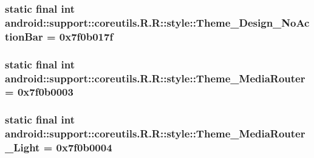\hypertarget{classandroid_1_1support_1_1coreutils_1_1_r_1_1style_0ce6d91f4469052e3060214f19d3eef9}{
\subsubsection[{Theme\_\-Design\_\-NoActionBar}]{\setlength{\rightskip}{0pt plus 5cm}static final int android::support::coreutils.R.R::style::Theme\_\-Design\_\-NoActionBar = 0x7f0b017f}}
\label{classandroid_1_1support_1_1coreutils_1_1_r_1_1style_0ce6d91f4469052e3060214f19d3eef9}


\hypertarget{classandroid_1_1support_1_1coreutils_1_1_r_1_1style_2dc043315162adcd87e26e2744a64a3c}{
\subsubsection[{Theme\_\-MediaRouter}]{\setlength{\rightskip}{0pt plus 5cm}static final int android::support::coreutils.R.R::style::Theme\_\-MediaRouter = 0x7f0b0003}}
\label{classandroid_1_1support_1_1coreutils_1_1_r_1_1style_2dc043315162adcd87e26e2744a64a3c}


\hypertarget{classandroid_1_1support_1_1coreutils_1_1_r_1_1style_9b7b8a5ef480b32c481c8e1e76947b82}{
\subsubsection[{Theme\_\-MediaRouter\_\-Light}]{\setlength{\rightskip}{0pt plus 5cm}static final int android::support::coreutils.R.R::style::Theme\_\-MediaRouter\_\-Light = 0x7f0b0004}}
\label{classandroid_1_1support_1_1coreutils_1_1_r_1_1style_9b7b8a5ef480b32c481c8e1e76947b82}



